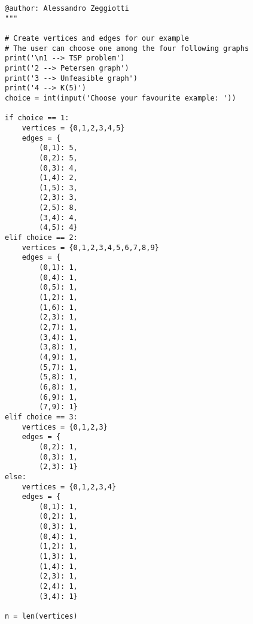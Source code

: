 \begin{verbatim}
@author: Alessandro Zeggiotti
"""

# Create vertices and edges for our example
# The user can choose one among the four following graphs
print('\n1 --> TSP problem')
print('2 --> Petersen graph')
print('3 --> Unfeasible graph')
print('4 --> K(5)')
choice = int(input('Choose your favourite example: '))

if choice == 1:
    vertices = {0,1,2,3,4,5}
    edges = {
        (0,1): 5,
        (0,2): 5,
        (0,3): 4,
        (1,4): 2,
        (1,5): 3,
        (2,3): 3,
        (2,5): 8,
        (3,4): 4,
        (4,5): 4}
elif choice == 2:
    vertices = {0,1,2,3,4,5,6,7,8,9}
    edges = {
        (0,1): 1,
        (0,4): 1,
        (0,5): 1,
        (1,2): 1,
        (1,6): 1,
        (2,3): 1,
        (2,7): 1,
        (3,4): 1,
        (3,8): 1,
        (4,9): 1,
        (5,7): 1,
        (5,8): 1,
        (6,8): 1,
        (6,9): 1,
        (7,9): 1}
elif choice == 3:
    vertices = {0,1,2,3}
    edges = {
        (0,2): 1,
        (0,3): 1,
        (2,3): 1}
else:
    vertices = {0,1,2,3,4}
    edges = {
        (0,1): 1,
        (0,2): 1,
        (0,3): 1,
        (0,4): 1,
        (1,2): 1,
        (1,3): 1,
        (1,4): 1,
        (2,3): 1,
        (2,4): 1,
        (3,4): 1}

n = len(vertices)


\end{verbatim}